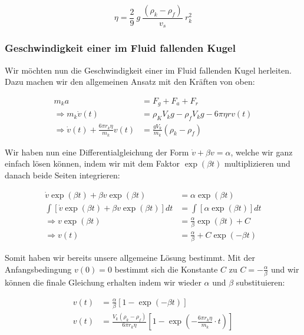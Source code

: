 \documentclass{article}
\begin{document}
\begin{equation}
    \eta = \frac{2}{9} \ g \ \frac{(\rho_k - \rho_f)}{v_s} \ r_k^2
    \label{eq:visk_stokes}
\end{equation}

\subsubsection{Geschwindigkeit einer im Fluid fallenden Kugel}

Wir möchten nun die Geschwindigkeit einer im Fluid fallenden Kugel herleiten. Dazu machen wir den allgemeinen Ansatz mit den Kräften von oben:

\begin{equation}
    \begin{split}
        m_k a &= F_g + F_a + F_r \\
        \Rightarrow m_k \dot{v}(t) &= \rho_K V_k g - \rho_f V_k g - 6 \pi \eta r v(t) \\
        \Rightarrow \dot{v}(t) + \frac{6 \pi r_k \eta}{m_k} v(t) &= \frac{gV_k}{m_k} (\rho_k - \rho_f)  
    \end{split}
\end{equation}

Wir haben nun eine Differentialgleichung der Form $\dot{v} + \beta v = \alpha$, welche wir ganz einfach lösen können, indem wir mit dem Faktor $\exp(\beta t)$ multiplizieren und danach beide Seiten integrieren:

\begin{equation}
    \begin{split}
        \dot{v} \exp(\beta t) + \beta v \exp(\beta t) &= \alpha \exp(\beta t) \\
        \int \left[ \dot{v} \exp(\beta t) + \beta v \exp(\beta t) \right] dt &= \int \left[ \alpha \exp(\beta t) \right] dt \\
        \Rightarrow v \exp(\beta t) &= \frac{\alpha}{\beta} \exp(\beta t) + C \\
        \Rightarrow v(t) &= \frac{\alpha}{\beta} + C \exp(-\beta t)
    \end{split}
\end{equation}

Somit haben wir bereits unsere allgemeine Lösung bestimmt. Mit der Anfangsbedingung $v(0) = 0$ bestimmt sich die Konstante $C$ zu $C = - \frac{\alpha}{\beta}$ und wir können die finale Gleichung erhalten indem wir wieder $\alpha$ und $\beta$ substituieren:

\begin{equation}
    \begin{split}
        v(t) &= \frac{\alpha}{\beta} [1 - \exp(- \beta t)] \\
        v(t) &= \frac{V_k (\rho_k - \rho_f)}{6 \pi r_k \eta} \left[ 1 - \exp{\left( - \frac{6 \pi r_k \eta}{m_k} \cdot t \right)} \right]
    \end{split}
\end{equation}
\end{document}
